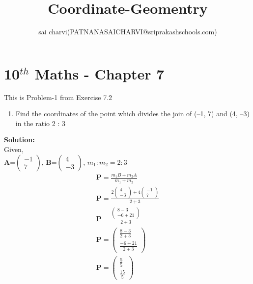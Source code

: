 \documentclass[12pt]{article}
\title{Coordinate-Geomentry}
\author{sai charvi(PATNANASAICHARVI@sriprakashschools.com)}
\newcommand{\myvec}[1]{\ensuremath{\begin{pmatrix}#1\end{pmatrix}}}
\newcommand{\solution}{\noindent \textbf{Solution: }}
\let\vec\mathbf
\begin{document}
\maketitle
\section*{10$^{th}$ Maths - Chapter 7}
This is Problem-1 from Exercise 7.2
\begin{enumerate}
\item Find the coordinates of the point which divides the join of (–1, 7) and (4, –3) in the
ratio 2 : 3\\
\end{enumerate}
\solution \\
Given,\\
$\vec{A}$=\myvec{-1\\7}, $\vec{B}$=\myvec{4\\-3},
$m_1:m_2=2:3$
\begin{align}
\vec{P}=\frac{m_1B+m_2A}{m_1+m_2}\\
\vec{P}=\frac{2\myvec{4\\-3}+4\myvec{-1\\7}}{2+3}\\
\vec{P}=\frac{\myvec{8-3\\-6+21}}{2+3}\\
\vec{P}=\myvec{\frac{8-3}{2+3}\\\frac{-6+21}{2+3}}\\
\vec{P}=\myvec{\frac{5}{5}\\\frac{15}{5}}
\end{align}
\end{document}
